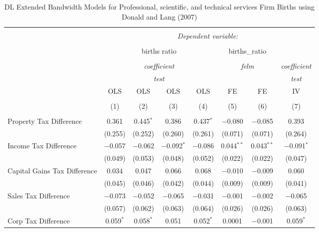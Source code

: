
\begin{table}[!htbp] \centering 
  \caption{DL Extended Bandwidth Models for  Professional, scientific, and technical services Firm Births using Donald and Lang (2007)} 
  \label{} 
\begin{tabular}{@{\extracolsep{5pt}}lccccccc} 
\\[-1.8ex]\hline 
\hline \\[-1.8ex] 
 & \multicolumn{7}{c}{\textit{Dependent variable:}} \\ 
\cline{2-8} 
\\[-1.8ex] & \multicolumn{4}{c}{births ratio} & \multicolumn{2}{c}{births\_ratio} &   \\ 
\\[-1.8ex] & \multicolumn{4}{c}{\textit{coefficient}} & \multicolumn{2}{c}{\textit{felm}} & \textit{coefficient} \\ 
 & \multicolumn{4}{c}{\textit{test}} & \multicolumn{2}{c}{\textit{}} & \textit{test} \\ 
 & OLS & OLS & OLS & OLS & FE & FE & IV \\ 
\\[-1.8ex] & (1) & (2) & (3) & (4) & (5) & (6) & (7)\\ 
\hline \\[-1.8ex] 
 Property Tax Difference & 0.361 & 0.445$^{*}$ & 0.386 & 0.437$^{*}$ & $-$0.080 & $-$0.085 & 0.393 \\ 
  & (0.255) & (0.252) & (0.260) & (0.261) & (0.071) & (0.071) & (0.264) \\ 
  Income Tax Difference & $-$0.057 & $-$0.062 & $-$0.092$^{*}$ & $-$0.086 & 0.044$^{**}$ & 0.043$^{**}$ & $-$0.091$^{*}$ \\ 
  & (0.049) & (0.053) & (0.048) & (0.052) & (0.022) & (0.022) & (0.047) \\ 
  Capital Gains Tax Difference & 0.034 & 0.047 & 0.066 & 0.068 & $-$0.010 & $-$0.009 & 0.060 \\ 
  & (0.045) & (0.046) & (0.042) & (0.044) & (0.009) & (0.009) & (0.041) \\ 
  Sales Tax Difference & $-$0.073 & $-$0.052 & $-$0.065 & $-$0.031 & $-$0.001 & $-$0.002 & $-$0.065 \\ 
  & (0.057) & (0.062) & (0.063) & (0.064) & (0.026) & (0.026) & (0.063) \\ 
  Corp Tax Difference & 0.059$^{*}$ & 0.058$^{*}$ & 0.051 & 0.052$^{*}$ & 0.0001 & $-$0.001 & 0.059$^{*}$ \\ 

\end{tabular}
\end{table}
